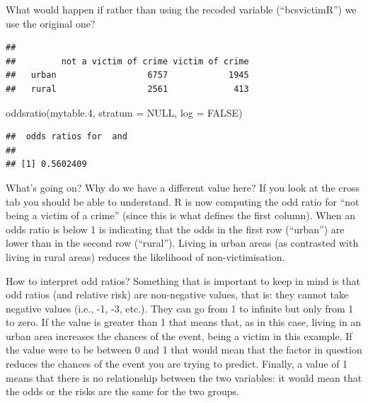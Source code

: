 \documentclass[
]{book}
\newenvironment{Shaded}{\begin{snugshade}}{\end{snugshade}}
\newcommand{\AttributeTok}[1]{\textcolor[rgb]{0.77,0.63,0.00}{#1}}
\newcommand{\ConstantTok}[1]{\textcolor[rgb]{0.00,0.00,0.00}{#1}}
\newcommand{\FloatTok}[1]{\textcolor[rgb]{0.00,0.00,0.81}{#1}}
\newcommand{\FunctionTok}[1]{\textcolor[rgb]{0.00,0.00,0.00}{#1}}
\newcommand{\NormalTok}[1]{#1}
\newcommand{\OtherTok}[1]{\textcolor[rgb]{0.56,0.35,0.01}{#1}}
\newcommand{\SpecialCharTok}[1]{\textcolor[rgb]{0.00,0.00,0.00}{#1}}
\begin{document}
What would happen if rather than using the recoded variable (``bcsvictimR'') we use the original one?

\begin{Shaded}
\end{Shaded}

\begin{verbatim}
##        
##         not a victim of crime victim of crime
##   urban                  6757            1945
##   rural                  2561             413
\end{verbatim}

\begin{Shaded}
\begin{Highlighting}[]
\FunctionTok{oddsratio}\NormalTok{(mytable}\FloatTok{.4}\NormalTok{, }\AttributeTok{stratum =} \ConstantTok{NULL}\NormalTok{, }\AttributeTok{log =} \ConstantTok{FALSE}\NormalTok{)}
\end{Highlighting}
\end{Shaded}

\begin{verbatim}
##  odds ratios for  and  
## 
## [1] 0.5602409
\end{verbatim}

What's going on? Why do we have a different value here? If you look at the cross tab you should be able to understand. R is now computing the odd ratio for ``not being a victim of a crime'' (since this is what defines the first column). When an odds ratio is below 1 is indicating that the odds in the first row (``urban'') are lower than in the second row (``rural''). Living in urban areas (as contrasted with living in rural areas) reduces the likelihood of non-victimisation.

How to interpret odd ratios? Something that is important to keep in mind is that odd ratios (and relative risk) are non-negative values, that is: they cannot take negative values (i.e., -1, -3, etc.). They can go from 1 to infinite but only from 1 to zero. If the value is greater than 1 that means that, as in this case, living in an urban area increases the chances of the event, being a victim in this example. If the value were to be between 0 and 1 that would mean that the factor in question reduces the chances of the event you are trying to predict. Finally, a value of 1 means that there is no relationship between the two variables: it would mean that the odds or the risks are the same for the two groups.
\end{document}
